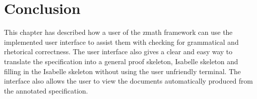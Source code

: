 \section{Conclusion}
This chapter has described how a user of the \gls{zmath} framework can use the
implemented user interface to assist them with checking for grammatical and
rhetorical correctness. The user interface also gives a clear and easy way to
translate the specification into a general proof skeleton, Isabelle skeleton and
filling in the Isabelle skeleton without using the user unfriendly terminal. The
interface also allows the user to view the documents automatically produced from
the annotated specification.